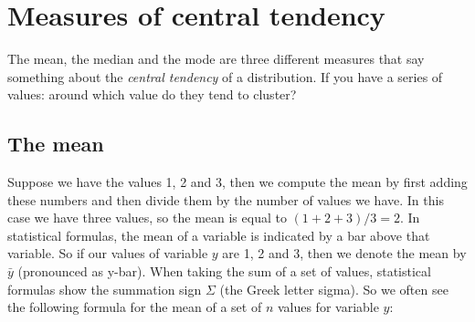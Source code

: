 % 
% 
% 
% 
% 
% 
% 
% 
% 
% 
% 





\section{Measures of central tendency}

The mean, the median and the mode are three different measures that say something about the \textit{central tendency} of a distribution. If you have a series of values: around which value do they tend to cluster?

\subsection{The mean}
Suppose we have the values 1, 2 and 3, then we compute the mean by first adding these numbers and then divide them by the number of values we have. In this case we have three values, so the mean is equal to $(1 + 2 + 3)/3 = 2$. In statistical formulas, the mean of a variable is indicated by a bar above that variable. So if our values of variable $y$ are 1, 2 and 3, then we denote the mean by $\bar{y}$ (pronounced as y-bar). When taking the sum of a set of values, statistical formulas show the summation sign $\Sigma$ (the Greek letter sigma). So we often see the following formula for the mean of a set of $n$ values for variable $y$:

